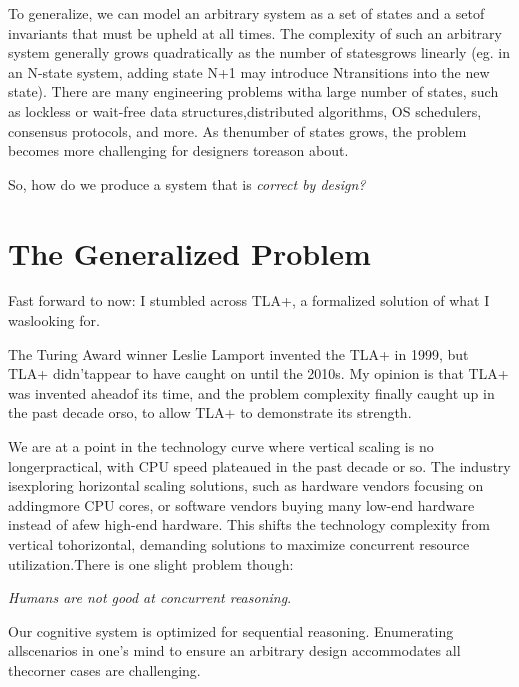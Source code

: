 To generalize, we can model an arbitrary system as a set of states and a setof invariants that must be upheld at all times. The complexity of such an arbitrary system generally grows quadratically as the number of statesgrows linearly (eg. in an N-state system, adding state N+1 may introduce Ntransitions into the new state). There are many engineering problems witha large number of states, such as lockless or wait-free data structures,distributed algorithms, OS schedulers, consensus protocols, and more. As thenumber of states grows, the problem becomes more challenging for designers toreason about.\newline

So, how do we produce a system that is \textit{correct by design?} 

\section{The Generalized Problem}

Fast forward to now: I stumbled across TLA+, a formalized solution of what I
waslooking for.\newline

The Turing Award winner Leslie Lamport invented the TLA+ in 1999, but TLA+
didn'tappear to have caught on until the 2010s. My opinion is that TLA+ was
invented aheadof its time, and the problem complexity finally caught up in the
past decade orso, to allow TLA+ to demonstrate its strength.\newline

We are at a point in the technology curve where vertical scaling is no
longerpractical, with CPU speed plateaued in the past decade or so. The industry
isexploring horizontal scaling solutions, such as hardware vendors focusing on
addingmore CPU cores, or software vendors buying many low-end hardware instead
of afew high-end hardware. This shifts the technology complexity from vertical
tohorizontal, demanding solutions to maximize concurrent resource
utilization.There is one slight problem though:\newline

\textit{Humans are not good at concurrent reasoning}. \newline

Our cognitive system is optimized for sequential reasoning. Enumerating
allscenarios in one's mind to ensure an arbitrary design accommodates all
thecorner cases are challenging.\newline

